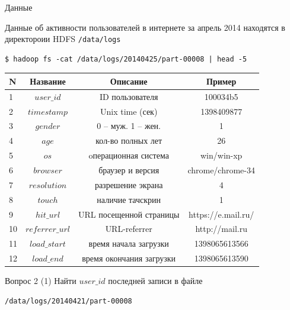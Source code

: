 \documentclass[10pt,a4paper]{beamer}
\begin{document}

\begin{frame}[fragile]{Данные}

\vspace{-0.5em}
Данные об активности пользователей в интернете за апрель 2014 находятся в директороии HDFS \texttt{/data/logs}
\begin{small}
\begin{shaded}
{\color{green} \begin{verbatim}
$ hadoop fs -cat /data/logs/20140425/part-00008 | head -5
\end{verbatim}}
\end{shaded}

\vspace{-1.5em}
\begin{center}
\begin{tabular}{l c c c}
\bf N & \bf Название & \bf Описание & \bf Пример \\
\hline
1 & $user\_id$ & ID пользователя & 100034b5 \\
2 & $timestamp$ & Unix time (сек) & 1398409877 \\
3 & $gender$ & 0 -- муж. 1 -- жен. & 1 \\
4 & $age$ & кол-во полных лет & 26 \\
5 & $os$ & oперационная система & win/win-xp \\
6 & $browser$ & браузер и версия & chrome/chrome-34 \\ 
7 & $resolution$ & разрешение экрана & 4 \\
8 & $touch$ & наличие тачскрин & 1 \\
9 & $hit\_url$ & URL посещенной страницы & https://e.mail.ru/ \\
10 & $referrer\_url$ & URL-referrer & http://mail.ru \\
11 & $load\_start$ & время начала загрузки & 1398065613566 \\
12 & $load\_end$ & время окончания загрузки & 1398065613590 \\
\end{tabular}
\end{center}
\end{small}

\end{frame}


\begin{frame}[fragile]{}

\begin{alertblock}{Вопрос 2 (1)}
Найти $user\_id$ последней записи в файле
\begin{shaded}
{\color{green} \begin{verbatim}
/data/logs/20140421/part-00008
\end{verbatim}}
\end{shaded}
\end{alertblock}

\end{frame}
\end{document}
